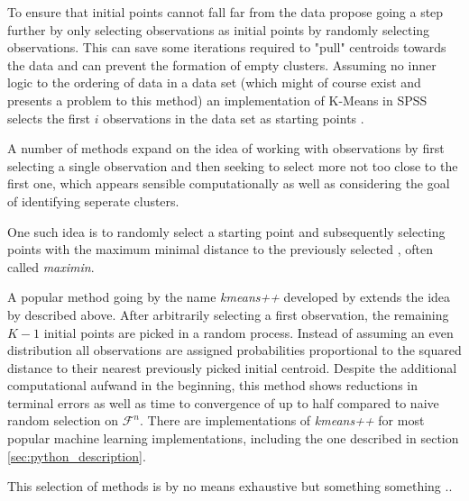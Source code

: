To ensure that initial points cannot fall far from the data \cite{forgy1965cluster,jancey1966multidimensional} propose going a step further by only selecting observations as initial points by randomly selecting observations. This can save some iterations required to "pull" centroids towards the data and can prevent the formation of empty clusters. Assuming no inner logic to the ordering of data in a data set (which might of course exist and presents a problem to this method) an implementation of K-Means in SPSS \cite{noruvsis2011ibm} selects the first $i$ observations in the data set as starting points \cite{macqueen1967some}. 

A number of methods expand on the idea of working with observations by first selecting a single observation and then seeking to select more not too close to the first one, which appears sensible computationally as well as considering the goal of identifying seperate clusters.

One such idea is to randomly select a starting point and subsequently selecting points with the maximum minimal distance to the previously selected \cite{gonzalez1985clustering}, often called \textit{maximin}.

A popular method going by the name \textit{kmeans++} developed by \cite{arthur2006k} extends the idea by \cite{macqueen1967some} described above. After arbitrarily selecting a first observation, the remaining $K-1$ initial points are picked in a random process. Instead of assuming an even distribution all observations are assigned probabilities proportional to the squared distance to their nearest previously picked initial centroid. Despite the additional computational aufwand in the beginning, this method shows reductions in terminal errors as well as time to convergence of up to half compared to naive random selection on $\mathcal{F}^{n}$. There are implementations of \textit{kmeans++} for most popular machine learning implementations, including the one described in section \ref{sec:python_description}.

This selection of methods is by no means exhaustive but something something ..

